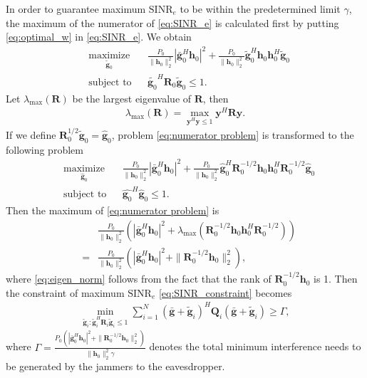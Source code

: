 \documentclass[conference]{IEEEtran}
\begin{document}
In order to guarantee maximum $\mathrm{SINR}_e$ to be within the predetermined limit $\gamma$, the maximum of the numerator of \eqref{eq:SINR_e} is calculated first by putting \eqref{eq:optimal_w} in \eqref{eq:SINR_e}. We obtain
\begin{equation}
\begin{aligned} \label{eq:numerator problem}
& \underset{\tilde{\mathbf{g}}_{0}}{\text{maximize}}
& & \frac{P_0}{\|\mathbf{h}_0\|_2^2}|\bar{\mathbf{g}}_0^H\mathbf{h}_0|^2 +\frac{P_0}{\|\mathbf{h}_0\|_2^2} \tilde{\mathbf{g}}_0^H\mathbf{h}_0\mathbf{h}_0^H\tilde{\mathbf{g}}_0 \\
& \text{subject to}
& & \tilde{\mathbf{g}_0}^H\mathbf{R}_0\tilde{\mathbf{g}}_0 \leq 1.
\end{aligned}
\end{equation}
Let $\lambda_{\mathrm{max}}(\mathbf{R})$ be the largest eigenvalue of $\mathbf{R}$, then
\begin{eqnarray}
\lambda_{\mathrm{max}}(\mathbf{R})= \max_{\mathbf{y}^H\mathbf{y} \leq 1} \mathbf{y}^H\mathbf{R}\mathbf{y}.
\end{eqnarray}
If we define $\mathbf{R}_0^{1/2}\tilde{\mathbf{g}}_0 = \hat{\mathbf{g}}_0$, problem \eqref{eq:numerator problem} is transformed to the following problem
\begin{equation}
\begin{aligned} \label{eq:numerator problem1}
& \underset{\hat{\mathbf{g}}_{0}}{\text{maximize}}
& & \frac{P_0}{\|\mathbf{h}_0\|_2^2}|\bar{\mathbf{g}}_0^H\mathbf{h}_0|^2 +\frac{P_0}{\|\mathbf{h}_0\|_2^2} \hat{\mathbf{g}}_0^H\mathbf{R}_0^{-1/2}\mathbf{h}_0\mathbf{h}_0^H\mathbf{R}_0^{-1/2}\hat{\mathbf{g}}_0 \\
& \text{subject to}
& & \hat{\mathbf{g}_0}^H\hat{\mathbf{g}}_0 \leq 1.
\end{aligned}
\end{equation}
Then the maximum of \eqref{eq:numerator problem} is
\begin{eqnarray}
&&\frac{P_0}{\|\mathbf{h}_0\|_2^2}\left(|\bar{\mathbf{g}}_0^H\mathbf{h}_0|^2 + \lambda_{\mathrm{max}}(\mathbf{R}_0^{-1/2}\mathbf{h}_0\mathbf{h}_0^H\mathbf{R}_0^{-1/2})\right)\\
&=&\frac{P_0}{\|\mathbf{h}_0\|_2^2}\left(|\bar{\mathbf{g}}_0^H\mathbf{h}_0|^2 + \|\mathbf{R}_0^{-1/2}\mathbf{h}_0\|_2^2\right)\label{eq:eigen_norm},
\end{eqnarray} 
where \eqref{eq:eigen_norm} follows from the fact that the rank of $\mathbf{R}_0^{-1/2}\mathbf{h}_0$ is 1. Then the constraint of maximum $\mathrm{SINR}_e$ \eqref{eq:SINR_constraint}  becomes
\begin{eqnarray}
\min_{\tilde{\mathbf{g}}_i: \tilde{\mathbf{g}}_i^H \mathbf{R}_i\tilde{\mathbf{g}}_i \leq 1}\sum_{i=1}^{N}(\bar{\mathbf{g}}+\tilde{\mathbf{g}}_i)^H\mathbf{Q}_i(\bar{\mathbf{g}}+\tilde{\mathbf{g}}_i) \geq \Gamma  \label{eq:artificial noise constraint},
\end{eqnarray}
where $\Gamma =\frac{P_0\left(|\bar{\mathbf{g}}_0^H\mathbf{h}_0|^2 + \|\mathbf{R}_0^{-1/2}\mathbf{h}_0\|_2^2\right)}{\|\mathbf{h}_0\|_2^2\gamma}$ denotes the total minimum interference needs to be generated by the jammers to the eavesdropper.
\end{document}
